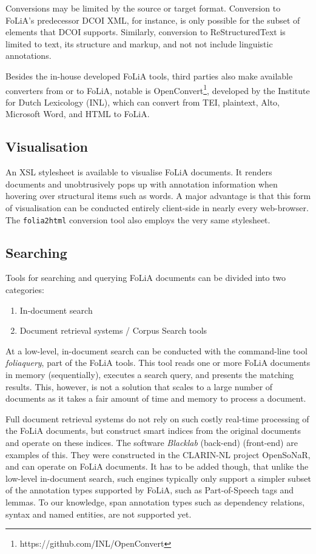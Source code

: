\documentclass[a4paper,10pt,twoside]{article}
\begin{document}
Conversions may be limited by the source or target format. Conversion to
FoLiA's predecessor DCOI XML, for instance, is only possible for the subset of
elements that DCOI supports. Similarly, conversion to
ReStructuredText is limited
to text, its structure and markup, and not not include linguistic annotations.

Besides the in-house developed FoLiA tools, third parties also make available
converters from or to FoLiA, notable is
OpenConvert\footnote{https://github.com/INL/OpenConvert}, developed by the Institute for Dutch Lexicology (INL),
which can convert from TEI, plaintext, Alto, Microsoft Word, and HTML to
FoLiA.

\subsection{Visualisation}

An XSL stylesheet is available to visualise FoLiA documents. It renders
documents and unobtrusively pops up with annotation information when hovering
over structural items such as words. A major advantage is that this form of
visualisation can be conducted entirely client-side in nearly every
web-browser. The \texttt{folia2html} conversion tool also employs the very same
stylesheet.

\subsection{Searching}

Tools for searching and querying FoLiA documents can be divided into two
categories:

\begin{enumerate}
 \item In-document search
 \item Document retrieval systems / Corpus Search tools
\end{enumerate}

At a low-level, in-document search can be conducted with the command-line tool
\emph{foliaquery}, part of the FoLiA tools. This tool reads one or more FoLiA
documents in memory (sequentially), executes a search query, and presents the
matching results. This, however, is not a solution that scales to a large
number of documents as it takes a fair amount of time and memory to process a document.

Full document retrieval systems do not rely on such costly real-time processing
of the FoLiA documents, but construct smart indices from the original documents
and operate on these indices. The software \emph{Blacklab} (back-end)
\cite{BLACKLAB} (front-end) \cite{WHITELAB} are examples of this. They were %
constructed in the CLARIN-NL project OpenSoNaR, and can operate on FoLiA
documents. It has to be added though, that unlike the low-level in-document
search, such engines typically only support a simpler subset of the annotation
types supported by FoLiA, such as Part-of-Speech tags and lemmas. To our
knowledge, span annotation types such as dependency relations, syntax and named
entities, are not supported yet.
\end{document}
